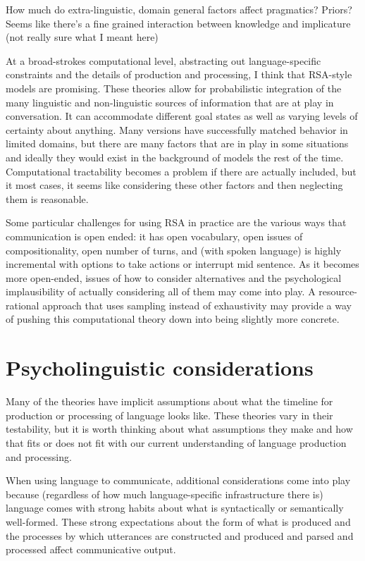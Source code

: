 \documentclass[]{article}
\begin{document}
How much do extra-linguistic, domain general factors affect pragmatics? Priors? Seems like there's a fine grained interaction between knowledge and implicature (not really sure what I meant here)

At a broad-strokes computational level, abstracting out language-specific constraints and the details of production and processing, I think that RSA-style models are promising. These theories allow for probabilistic integration of the many linguistic and non-linguistic sources of information that are at play in conversation. It can accommodate different goal states as well as varying levels of certainty about anything. Many versions have successfully matched behavior in limited domains, but there are many factors that are in play in some situations and ideally they would exist in the background of models the rest of the time. Computational tractability becomes a problem if there are actually included, but it most cases, it seems like considering these other factors and then neglecting them is reasonable. 

Some particular challenges for using RSA in practice are the various ways that communication is open ended: it has open vocabulary, open issues of compositionality, open number of turns, and (with spoken language) is highly incremental with options to take actions or interrupt mid sentence. As it becomes more open-ended, issues of how to consider alternatives and the psychological implausibility of actually considering all of them may come into play. A resource-rational approach that uses sampling instead of exhaustivity may provide a way of pushing this computational theory down into being slightly more concrete. 


\section{Psycholinguistic considerations}

Many of the theories have implicit assumptions about what the timeline for production or processing of language looks like. These theories vary in their testability, but it is worth thinking about what assumptions they make and how that fits or does not fit with our current understanding of language production and processing. 

When using language to communicate, additional considerations come into play because (regardless of how much language-specific infrastructure there is) language comes with strong habits about what is syntactically or semantically well-formed. These strong expectations about the form of what is produced and the processes by which utterances are constructed and produced and parsed and processed affect communicative output.
\end{document}

